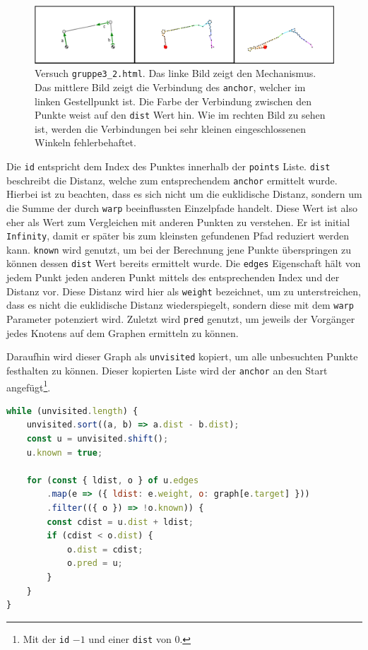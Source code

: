 \begin{figure}
    \centering
    \includegraphics[width=\textwidth]{gfx/dijkstra_edit.png}
    \caption[Versuch \lstinline{gruppe3_2.html}]{Versuch \lstinline{gruppe3_2.html}. Das linke Bild zeigt den Mechanismus. Das mittlere Bild zeigt die Verbindung des \lstinline{anchor}, welcher im linken Gestellpunkt ist. Die Farbe der Verbindung zwischen den Punkte weist auf den \lstinline{dist} Wert hin.
    Wie im rechten Bild zu sehen ist, werden die Verbindungen bei sehr kleinen eingeschlossenen Winkeln fehlerbehaftet.}
    \label{fig:gruppe3_1}
\end{figure}

Die \lstinline{id} entspricht dem Index des Punktes innerhalb der \lstinline{points} Liste.
\lstinline{dist} beschreibt die Distanz, welche zum entsprechendem \lstinline{anchor} ermittelt wurde.
Hierbei ist zu beachten, dass es sich nicht um die euklidische Distanz, sondern um die Summe der durch \lstinline{warp} beeinflussten Einzelpfade handelt.
Diese Wert ist also eher als Wert zum Vergleichen mit anderen Punkten zu verstehen.
Er ist initial \lstinline{Infinity}, damit er später bis zum kleinsten gefundenen Pfad reduziert werden kann.
\lstinline{known} wird genutzt, um bei der Berechnung jene Punkte überspringen zu können dessen \lstinline{dist} Wert bereits ermittelt wurde.
Die \lstinline{edges} Eigenschaft hält von jedem Punkt jeden anderen Punkt mittels des entsprechenden Index und der Distanz vor.
Diese Distanz wird hier als \lstinline{weight} bezeichnet, um zu unterstreichen, dass es nicht die euklidische Distanz wiederspiegelt, sondern diese mit dem \lstinline{warp} Parameter potenziert wird.
Zuletzt wird \lstinline{pred} genutzt, um jeweils der Vorgänger jedes Knotens auf dem Graphen ermitteln zu können.

Daraufhin wird dieser Graph als \lstinline{unvisited} kopiert, um alle unbesuchten Punkte festhalten zu können.
Dieser kopierten Liste wird der \lstinline{anchor} an den Start angefügt\footnote{Mit der \lstinline{id} $-1$ und einer \lstinline{dist} von 0.}.

\begin{lstlisting}[language=JavaScript, caption={Berechnung der \lstinline{dist} Eigenschaft der einzelnen Objekte aus dem Dijkstra-Graphen.}, label={lst:creation_dijkstra_graph}]
while (unvisited.length) {
    unvisited.sort((a, b) => a.dist - b.dist);
    const u = unvisited.shift();
    u.known = true;

    for (const { ldist, o } of u.edges
        .map(e => ({ ldist: e.weight, o: graph[e.target] }))
        .filter(({ o }) => !o.known)) {
        const cdist = u.dist + ldist;
        if (cdist < o.dist) {
            o.dist = cdist;
            o.pred = u;
        }
    }
}
\end{lstlisting}

